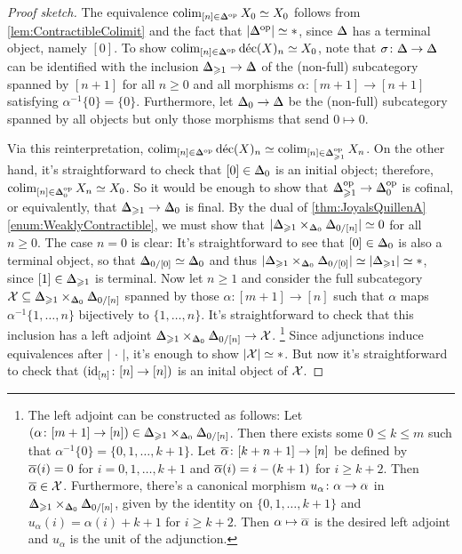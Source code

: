 \begin{proof}[Proof sketch]
	The equivalence $\colimit_{[n]\in\IDelta^\op}X_0\simeq X_0$ follows from \cref{lem:ContractibleColimit} and the fact that $\left|\IDelta^\op\right|\simeq *$, since $\IDelta$ has a terminal object, namely $[0]$. To show $\colimit_{[n]\in\IDelta^\op}\operatorname{d\acute{e}c}(X)_n\simeq X_0$, note that $\sigma\colon \IDelta\rightarrow \IDelta$ can be identified with the inclusion $\IDelta_{\geqslant 1}\rightarrow\IDelta$ of the (non-full) subcategory spanned by $[n+1]$ for all $n\geqslant 0$ and all morphisms $\alpha\colon [m+1]\rightarrow [n+1]$ satisfying $\alpha^{-1}\{0\}=\{0\}$. Furthermore, let $\IDelta_0\rightarrow \IDelta$ be the (non-full) subcategory spanned by all objects but only those morphisms that send $0\mapsto 0$.
	
	Via this reinterpretation, $\colimit_{[n]\in\IDelta^\op}\operatorname{d\acute{e}c}(X)_n\simeq \colimit_{[n]\in\IDelta_{\geqslant 1}^\op}X_n$.
	On the other hand, it's straightforward to check that $[0]\in \IDelta_0$ is an initial object; therefore, $\colimit_{[n]\in \IDelta_0^\op}X_n\simeq X_0$. So it would be enough to show that $\IDelta_{\geqslant 1}^\op\rightarrow \IDelta_0^\op$ is cofinal, or equivalently, that $\IDelta_{\geqslant 1}\rightarrow \IDelta_0$ is final. By the dual of \cref{thm:JoyalsQuillenA}\cref{enum:WeaklyContractible}, we must show that $\mathopen|\IDelta_{\geqslant 1}\times_{\IDelta_0}\IDelta_{0/[n]}\mathclose|\simeq 0$ for all $n\geqslant 0$. The case $n=0$ is clear: It's straightforward to see that $[0]\in \IDelta_{0}$ is also a terminal object, so that $\IDelta_{0/[0]}\simeq \IDelta_0$ and thus $\mathopen|\IDelta_{\geqslant 1}\times_{\IDelta_0}\IDelta_{0/[0]}\mathclose|\simeq \mathopen|\IDelta_{\geqslant 1}\mathclose|\simeq *$, since $[1]\in \IDelta_{\geqslant 1}$ is terminal. Now let $n\geqslant 1$ and consider the full subcategory $\Xx\subseteq \IDelta_{\geqslant 1}\times_{\IDelta_0}\IDelta_{0/[n]}$ spanned by those $\alpha\colon [m+1]\rightarrow [n]$ such that $\alpha$ maps $\alpha^{-1}\{1,\dotsc,n\}$ bijectively to $\{1,\dotsc,n\}$. It's straightforward to check that this inclusion has a left adjoint $\IDelta_{\geqslant 1}\times_{\IDelta_0}\IDelta_{0/[n]}\rightarrow \Xx$.%
	\footnote{The left adjoint can be constructed as follows: Let $(\alpha\colon [m+1]\rightarrow [n])\in \IDelta_{\geqslant 1}\times_{\IDelta_0}\IDelta_{0/[n]}$. Then there exists some $0\leqslant k\leqslant m$ such that $\alpha^{-1}\{0\}=\{0,1,\dotsc,k+1\}$. Let $\ov\alpha\colon [k+n+1]\rightarrow[n]$ be defined by $\ov\alpha(i)=0$ for $i=0,1,\dotsc,k+1$ and $\ov\alpha(i)=i-(k+1)$ for $i\geqslant k+2$. Then $\ov\alpha\in \Xx$. Furthermore, there's a canonical morphism $u_\alpha\colon \alpha\rightarrow \ov\alpha$ in $\IDelta_{\geqslant 1}\times_{\IDelta_0}\IDelta_{0/[n]}$, given by the identity on $\{0,1,\dotsc,k+1\}$ and $u_\alpha(i)=\alpha(i)+k+1$ for $i\geqslant k+2$. Then $\alpha\mapsto \ov\alpha$ is the desired left adjoint and $u_\alpha$ is the unit of the adjunction.}
	Since adjunctions induce equivalences after $\left|\,\cdot\,\right|$, it's enough to show $\left|\Xx\right|\simeq *$. But now it's straightforward to check that $(\operatorname{id}_{[n]}\colon [n]\rightarrow [n])$ is an inital object of $\mathcal{X}$.
\end{proof}
